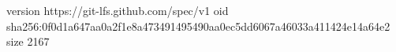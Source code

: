 version https://git-lfs.github.com/spec/v1
oid sha256:0f0d1a647aa0a2f1e8a473491495490aa0ec5dd6067a46033a411424e14a64e2
size 2167
